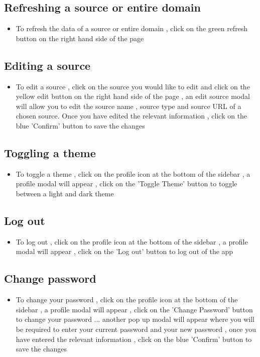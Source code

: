 \documentclass[12pt]{article}
\begin{document}
\subsection{Refreshing a source or entire domain}
\begin{itemize}
    \item To refresh the data of a source or entire domain , click on the green refresh button on the right hand side of the page
\end{itemize}
\subsection{Editing a source}
\begin{itemize}
    \item To edit a source , click on the source you would like to edit and click on the yellow edit button on the right hand side of the page , an edit source modal will allow you to edit the source name , source type and source URL of a chosen source. Once you have edited the relevant information , click on the blue 'Confirm' button to save the changes
\end{itemize}
\subsection{Toggling a theme}
\begin{itemize}
    \item To toggle a theme , click on the profile icon at the bottom of the sidebar , a profile modal will appear , click on the 'Toggle Theme' button to toggle between a light and dark theme
\end{itemize}
\subsection{Log out}
\begin{itemize}
    \item To log out , click on the profile icon at the bottom of the sidebar , a profile modal will appear , click on the 'Log out' button to log out of the app
\end{itemize}
\subsection{Change password}
\begin{itemize}
    \item To change your password , click on the profile icon at the bottom of the sidebar , a profile modal will appear , click on the 'Change Password' button to change your password ... another pop up modal will appear where you will be required to enter your current password and your new password , once you have entered the relevant information , click on the blue 'Confirm' button to save the changes
\end{itemize}
\end{document}
